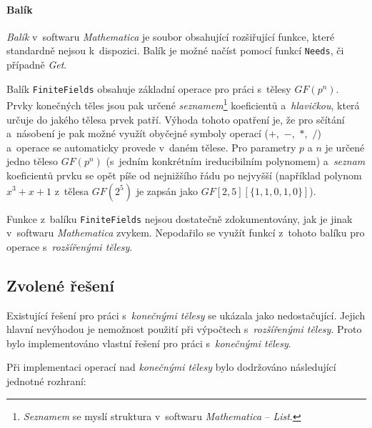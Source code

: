 \documentclass[thesis=M,czech,hidelinks]{FITthesis}[2012/06/26]
\newcommand{\0}{{\textcolor[gray]{0.75}{0}}}
\begin{document}
\paragraph{Balík} \emph{Balík} v~softwaru \emph{Mathematica} je soubor
obsahující rozšiřující funkce, které standardně nejsou k~dispozici. Balík je
možné načíst pomocí funkcí \texttt{Needs}, či případně \emph{Get}.

Balík \texttt{FiniteFields} obsahuje základní operace pro práci s~tělesy
$GF(p^n)$. Prvky konečných těles jsou pak určené \emph{seznamem}\footnote{
    \emph{Seznamem} se myslí struktura v~softwaru \emph{Mathematica}
    -- \emph{List}.
} koeficientů a~\emph{hlavičkou}, která určuje do jakého tělesa prvek patří.
Výhoda tohoto opatření je, že pro sčítání a~násobení je pak možné využít
obyčejné symboly operací ($+$,~$-$,~$*$,~$/$) a~operace se automaticky provede
v~daném tělese. Pro parametry $p$ a $n$ je určené jedno těleso $GF(p^n)$
(s~jedním konkrétním ireducibilním polynomem) a~\emph{seznam} koeficientů prvku
se opět píše od nejnižšího řádu po nejvyšší (například polynom $x^3 + x + 1$
z~tělesa $GF(2^5)$ je zapsán jako $GF[2,5][\{1,1,0,1,0\}] $).

Funkce z~balíku \texttt{FiniteFields} nejsou dostatečně zdokumentovány, jak je
jinak v~softwaru \emph{Mathematica} zvykem. Nepodařilo se využít funkcí z~tohoto
balíku pro operace s~\emph{rozšířenými tělesy}.


\subsection{Zvolené řešení}\label{kap_zvolene_reseni}

Existující řešení pro práci s~\emph{konečnými tělesy} se ukázala jako
nedostačující. Jejich hlavní nevýhodou je nemožnost použití při výpočtech
s~\emph{rozšířenými tělesy}. Proto bylo implementováno vlastní řešení pro práci
s~\emph{konečnými tělesy}.

Při implementaci operací nad \emph{konečnými tělesy} bylo dodržováno následující
jednotné rozhraní:
\end{document}
